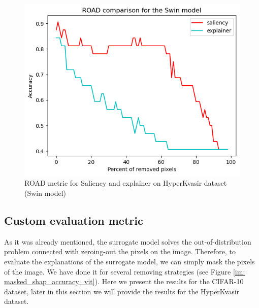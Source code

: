 \documentclass[magisterska,en]{pracamgr}
\begin{document}
\begin{figure}[H]
\centering
\includegraphics[scale=0.6]{./images/ROAD_gastro_swin.png}
\caption{ROAD metric for Saliency and explainer on HyperKvasir dataset (Swin model)}
\label{ROAD_gastro_swin}
\end{figure}










\subsection{Custom evaluation metric}

As it was already mentioned, the surrogate model solves the out-of-distribution problem connected with zeroing-out the pixels on the image. Therefore, to evaluate the explanations of the surrogate model, we can simply mask the pixels of the image. We have done it for several removing strategies (see Figure \ref{im: masked_shap_accuracy_vit}). Here we present the results for the CIFAR-10 dataset, later in this section we will provide the results for the HyperKvasir dataset.


\end{document}
